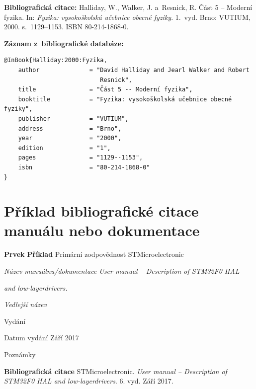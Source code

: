 \noindent \textbf{Bibliografická citace:} \odradkovani
{\sc Halliday}, W., {\sc Walker}, J. a~{\sc Resnick}, R. Část 5 -- Moderní fyzika.
In: {\em Fyzika: vysokoškolská učebnice obecné fyziky}. 1.~vyd. Brno: VUTIUM, 2000. s.~1129--1153. ISBN 80-214-1868-0.

\bigskip \bigskip
\noindent \textbf{Záznam z~bibliografické databáze:}
\vspace{-0.5em}
\begin{verbatim}
@InBook{Halliday:2000:Fyzika,
    author              = "David Halliday and Jearl Walker and Robert 
                           Resnick",
    title               = "Část 5 -- Moderní fyzika",
    booktitle           = "Fyzika: vysokoškolská učebnice obecné fyziky",
    publisher           = "VUTIUM",
    address             = "Brno",
    year                = "2000",
    edition             = "1",
    pages               = "1129--1153",
    isbn                = "80-214-1868-0"
}
\end{verbatim}


\newpage
\section*{Příklad bibliografické citace manuálu nebo dokumentace}
\label{pr-manual-doc}
\begin{tabbing}
\zarazky
\textbf{Prvek} \> \textbf{Příklad} \odradkovani
Primární zodpovědnost \>
STMicroelectronic

\odradkovani
{\em Název manuálnu/dokumentace} \>
{\em User manual -- Description of STM32F0 HAL}
    
    \odradkovani \>
    {\em and low-layerdrivers.}

\odradkovani
{\em Vedlejší název}\footnotemark[1] \>

\odradkovani
Vydání 

\odradkovani
Datum vydání \>
Září 2017

\odradkovani
Poznámky\footnotemark[2] \>

\odradkovani
\end{tabbing}

\noindent \textbf{Bibliografická citace} \odradkovani
{\sc STMicroelectronic}. {\em User manual -- Description of STM32F0 HAL and low-layerdrivers}. 6. vyd. Září 2017.

